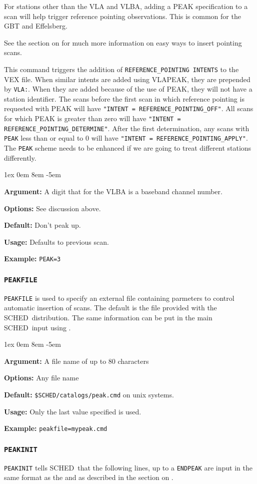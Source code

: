 \documentclass{report}
\newcommand{\schedb}{{\sc SCHED~}}
\newcommand{\rcwbox}[5]{
  \begin{list}{}{\parsep 1ex  \itemsep 0em
                 \leftmargin 8em  \itemindent -5em }
    \item {\bf Argument:} #1
    \item {\bf Options:}  #2
    \item {\bf Default:}  #3
    \item {\bf Usage:}    #4
    \item {\bf Example:}  #5
  \end{list}
}
\begin{document}
For stations other than the VLA and VLBA, adding a PEAK specification
to a scan will help trigger reference pointing observations.  This 
is common for the GBT and Effelsberg.

See the section on  for
much more information on easy ways to insert pointing scans.

This command triggers the addition of {\tt REFERENCE\_POINTING 
INTENTS} to the VEX file.  When similar intents are added using 
VLAPEAK, they are prepended by {\tt VLA:}.  When they are added
because of the use of PEAK, they will not have a station identifier.
The scans before the first scan in which reference pointing is
requested with PEAK will have {\tt "INTENT = REFERENCE\_POINTING\_OFF"}.
All scans for which PEAK is greater than zero will have 
{\tt "INTENT = REFERENCE\_POINTING\_DETERMINE"}.  After the first
determination, any scans with {\tt PEAK} less than or equal to 0 
will have {\tt "INTENT = REFERENCE\_POINTING\_APPLY"}.  The {\tt PEAK}
scheme needs to be enhanced if we are going to treat different 
stations differently.

\rcwbox
{A digit that for the VLBA is a baseband channel number.}
{See discussion above.}
{Don't peak up.}
{Defaults to previous scan.}
{{\tt PEAK=3}}


\subsubsection{\label{MP:PEAKFILE}{\tt PEAKFILE}}

{\tt PEAKFILE} is used to specify an external file containing
parmeters to control automatic insertion of  scans.  The default is the file provided
with the \schedb distribution.  The same information can be put
in the main \schedb input using .

\rcwbox
{A file name of up to 80 characters}
{Any file name}
{{\tt \$SCHED/catalogs/peak.cmd} on unix systems.}
{Only the last value specified is used.}
{{\tt peakfile=mypeak.cmd}}


\subsubsection{\label{MP:PEAKINIT}{\tt PEAKINIT}}

{\tt PEAKINIT} tells \schedb that the following lines, up to a
{\tt ENDPEAK} are input in the same format as the
 and as described in the section on
.
\end{document}
